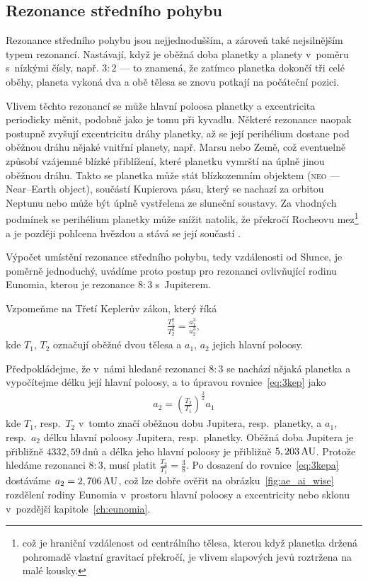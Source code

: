 \documentclass[A4paper, 12pt, oneside]{book}
\newcommand{\C}[1]{\textsc{#1}}
\begin{document}
\subsection{Rezonance středního pohybu} \label{sec:meanmotion}

Rezonance středního pohybu jsou nejjednodušším, a zároveň také nejsilnějším typem rezonancí. Nastávají, když je oběžná doba planetky a planety v~poměru s~nízkými čísly, např. $3:2$ --- to znamená, že zatímco planetka dokončí tři celé oběhy, planeta vykoná dva a obě tělesa se znovu potkají na počáteční pozici. 

Vlivem těchto rezonancí se může hlavní poloosa planetky a excentricita periodicky měnit, podobně jako je tomu při kyvadlu. Některé rezonance naopak postupně zvyšují excentricitu dráhy planetky, až se její perihélium dostane pod oběžnou dráhu nějaké vnitřní planety, např. Marsu nebo Země, což eventuelně způsobí vzájemné blízké přiblížení, které planetku vymrští na úplně jinou oběžnou dráhu. Takto se planetka může stát blízkozemním objektem (\C{neo} --- Near--Earth object), součástí Kupierova pásu, který se nachazí za orbitou Neptunu nebo může být úplně vystřelena ze sluneční soustavy. Za vhodných podmínek se perihélium planetky může snížit natolik, že překročí Rocheovu mez\footnote{což je hraniční vzdálenost od centrálního tělesa, kterou když planetka držená pohromadě vlastní gravitací překročí, je vlivem slapových jevů roztržena na malé kousky.} a je později pohlcena hvězdou a stává se její součastí \cite{pichierri17}.

Výpočet umístění rezonance středního pohybu, tedy vzdálenosti od Slunce, je poměrně jednoduchý, uvádíme proto postup pro rezonanci ovlivňující rodinu Eunomia, kterou je rezonance $8:3$ s~Jupiterem.

Vzpomeňme na Třetí Keplerův zákon, který říká
\begin{align} \label{eq:3kep}
	\frac{T_1^2}{T_2^2}=\frac{a_1^3}{a_2^3}, 
\end{align}
kde $T_1$, $T_2$ označují oběžné dvou tělesa a $a_1$, $a_2$ jejich hlavní poloosy. 

Předpokládejme, že v~námi hledané rezonanci $8:3$ se nachází nějaká planetka a vypočítejme délku její hlavní poloosy, a to úpravou rovnice~\eqref{eq:3kep} jako
\begin{align} \label{eq:3kepa}
	a_2=\left(\frac{T_2}{T_1}\right)^{\frac{3}{2}}a_1
\end{align}
kde $T_1$, resp.\ $T_2$ v~tomto značí oběžnou dobu Jupitera, resp.\ planetky, a $a_1$, resp.\ $a_2$ délku hlavní poloosy Jupitera, resp.\ planetky. Oběžná doba Jupitera je přibližně $4332,59\,$dnů a délka jeho hlavní poloosy je přibližně $5,203\,{\rm AU}$. Protože hledáme rezonanci $8:3$, musí platit $\frac{T_2}{T_1}=\frac{3}{8}$. Po dosazení do rovnice~\eqref{eq:3kepa} dostáváme $a_2=2,706\,{\rm AU}$, což lze dobře ověřit na obrázku~\ref{fig:ae_ai_wise} rozdělení rodiny Eunomia v~prostoru hlavní poloosy a excentricity nebo sklonu v~pozdější kapitole~\ref{ch:eunomia}.
\end{document}
